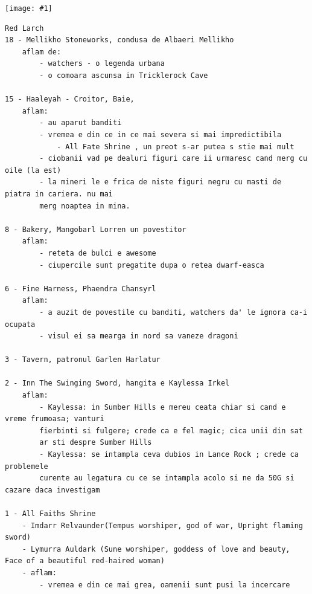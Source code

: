 \documentclass[12pt,twoside]{book}
\newcommand{\showmap}[1]{
	\begin{center}
		\texttt{[image: \#1]}
	\end{center}
}
\begin{document}
\showmap{images/maps/red-larch}

\begin{verbatim}
Red Larch
18 - Mellikho Stoneworks, condusa de Albaeri Mellikho
	aflam de:
		- watchers - o legenda urbana
		- o comoara ascunsa in Tricklerock Cave

15 - Haaleyah - Croitor, Baie, 
	aflam:
		- au aparut banditi
		- vremea e din ce in ce mai severa si mai impredictibila
			- All Fate Shrine , un preot s-ar putea s stie mai mult
		- ciobanii vad pe dealuri figuri care ii urmaresc cand merg cu oile (la est)
		- la mineri le e frica de niste figuri negru cu masti de piatra in cariera. nu mai
		merg noaptea in mina.

8 - Bakery, Mangobarl Lorren un povestitor
	aflam:
		- reteta de bulci e awesome
		- ciupercile sunt pregatite dupa o retea dwarf-easca

6 - Fine Harness, Phaendra Chansyrl
	aflam:
		- a auzit de povestile cu banditi, watchers da' le ignora ca-i ocupata
		- visul ei sa mearga in nord sa vaneze dragoni

3 - Tavern, patronul Garlen Harlatur
	
2 - Inn The Swinging Sword, hangita e Kaylessa Irkel
	aflam:
		- Kaylessa: in Sumber Hills e mereu ceata chiar si cand e vreme frumoasa; vanturi
		fierbinti si fulgere; crede ca e fel magic; cica unii din sat
		ar sti despre Sumber Hills
		- Kaylessa: se intampla ceva dubios in Lance Rock ; crede ca problemele
		curente au legatura cu ce se intampla acolo si ne da 50G si cazare daca investigam

1 - All Faiths Shrine
	- Imdarr Relvaunder(Tempus worshiper, god of war, Upright flaming sword)
	- Lymurra Auldark (Sune worshiper, goddess of love and beauty, Face of a beautiful red-haired woman)
	- aflam:
		- vremea e din ce mai grea, oamenii sunt pusi la incercare
		

\end{verbatim}
\end{document}
